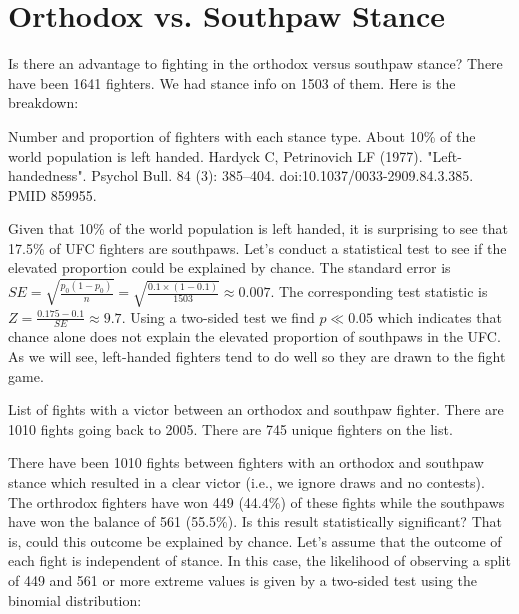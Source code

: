 \clearpage
\section*{Orthodox vs. Southpaw Stance}

Is there an advantage to fighting in the orthodox versus southpaw stance?
There have been 1641 fighters. We had stance info on 1503 of them. Here is the
breakdown:

\begin{center}
\begin{table}[h]

\caption{Number and proportion of fighters with each stance type. About 10\% of the
world population is left handed. Hardyck C, Petrinovich LF (1977). "Left-handedness". Psychol Bull. 84 (3): 385–404. doi:10.1037/0033-2909.84.3.385. PMID 859955.}
\end{table}
\end{center}

Given that 10\% of the world population is left handed, it is surprising to see that 17.5\%
of UFC fighters are southpaws. Let's conduct a statistical test to see if the elevated
proportion could be explained by chance.
The standard error is $SE = \sqrt{\frac{p_0(1-p_0)}{n}}=\sqrt{\frac{0.1\times(1 - 0.1)}{1503}}\approx0.007$.
The corresponding test statistic is $Z = \frac{0.175 - 0.1}{SE}\approx9.7$. Using a two-sided test
we find $p \ll 0.05$ which indicates that chance alone does not explain the elevated proportion of southpaws in the UFC.
As we will see, left-handed fighters tend to do well so they are drawn to the fight game.

\begin{center}
\begin{table}[h]

\caption{List of fights with a victor between an orthodox and southpaw fighter. There are 1010 fights going back to 2005. There are 745 unique fighters on the list.}
\end{table}
\end{center}

There have been 1010 fights between fighters with an orthodox and southpaw stance which resulted in a clear victor (i.e., we ignore draws and no contests). The orthrodox fighters have won 449 (44.4\%) of these fights while the southpaws have won the balance of 561 (55.5\%). Is this result statistically significant? That is, could this outcome be explained by chance. Let's assume that the outcome of each fight is independent of stance. In this case, the likelihood of observing a split of 449 and 561 or more extreme values is given by a two-sided test using the binomial distribution:

